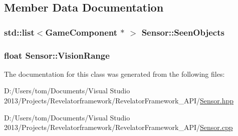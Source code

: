 \subsection{Member Data Documentation}
\hypertarget{class_sensor_a3ed58c2bc9140a884ce86014fbfd6926}{
\subsubsection[{Seen\-Objects}]{\setlength{\rightskip}{0pt plus 5cm}std\-::list$<${\bf Game\-Component} $\ast$ $>$ Sensor\-::\-Seen\-Objects\hspace{0.3cm}{\ttfamily [private]}}}\label{class_sensor_a3ed58c2bc9140a884ce86014fbfd6926}
\hypertarget{class_sensor_af509a7308626a219e017f07c0d25a78f}{
\subsubsection[{Vision\-Range}]{\setlength{\rightskip}{0pt plus 5cm}float Sensor\-::\-Vision\-Range\hspace{0.3cm}{\ttfamily [private]}}}\label{class_sensor_af509a7308626a219e017f07c0d25a78f}


The documentation for this class was generated from the following files\-:\begin{DoxyCompactItemize}
\item 
D\-:/\-Users/tom/\-Documents/\-Visual Studio 2013/\-Projects/\-Revelatorframework/\-Revelator\-Framework\-\_\-\-A\-P\-I/\hyperlink{_sensor_8hpp}{Sensor.\-hpp}\item 
D\-:/\-Users/tom/\-Documents/\-Visual Studio 2013/\-Projects/\-Revelatorframework/\-Revelator\-Framework\-\_\-\-A\-P\-I/\hyperlink{_sensor_8cpp}{Sensor.\-cpp}\end{DoxyCompactItemize}
